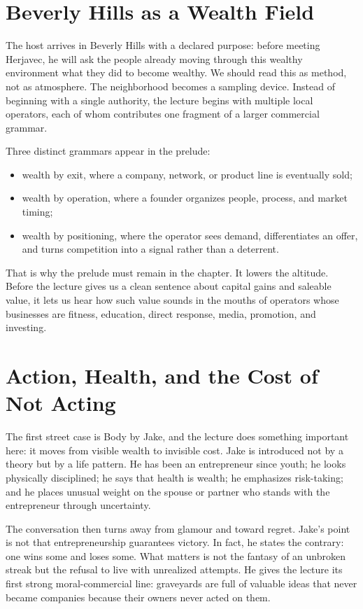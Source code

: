 \section{Beverly Hills as a Wealth Field}

The host arrives in Beverly Hills with a declared purpose: before meeting Herjavec, he will ask the people already moving through this wealthy environment what they did to become wealthy. We should read this as method, not as atmosphere. The neighborhood becomes a sampling device. Instead of beginning with a single authority, the lecture begins with multiple local operators, each of whom contributes one fragment of a larger commercial grammar.

Three distinct grammars appear in the prelude:
\begin{itemize}
\item wealth by exit, where a company, network, or product line is eventually sold;
\item wealth by operation, where a founder organizes people, process, and market timing;
\item wealth by positioning, where the operator sees demand, differentiates an offer, and turns competition into a signal rather than a deterrent.
\end{itemize}

That is why the prelude must remain in the chapter. It lowers the altitude. Before the lecture gives us a clean sentence about capital gains and saleable value, it lets us hear how such value sounds in the mouths of operators whose businesses are fitness, education, direct response, media, promotion, and investing.

\section{Action, Health, and the Cost of Not Acting}

The first street case is Body by Jake, and the lecture does something important here: it moves from visible wealth to invisible cost. Jake is introduced not by a theory but by a life pattern. He has been an entrepreneur since youth; he looks physically disciplined; he says that health is wealth; he emphasizes risk-taking; and he places unusual weight on the spouse or partner who stands with the entrepreneur through uncertainty.

The conversation then turns away from glamour and toward regret. Jake's point is not that entrepreneurship guarantees victory. In fact, he states the contrary: one wins some and loses some. What matters is not the fantasy of an unbroken streak but the refusal to live with unrealized attempts. He gives the lecture its first strong moral-commercial line: graveyards are full of valuable ideas that never became companies because their owners never acted on them.

